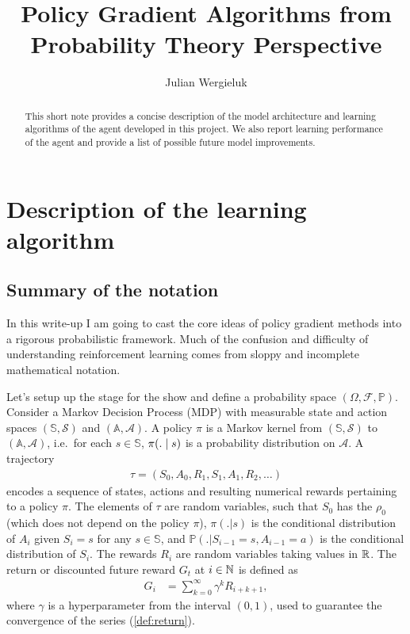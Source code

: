 \documentclass[a4paper,12pt]{amsart}
\title{Policy Gradient Algorithms from Probability Theory Perspective}
\author{Julian Wergieluk}\address{}\email{julian.wergieluk@risklab.com}
\newcommand{\stateSpace}{\mathbb S}
\newcommand{\stateSpaceAlg}{\mathcal S}
\newcommand{\actionSpace}{\mathbb A}
\newcommand{\actionSpaceAlg}{\mathcal A}
\newcommand{\policy}{\pi}
\newcommand{\discountFactor}{\gamma}
\newcommand{\prob}{\mathbb P}
\newcommand{\trajectory}{\tau}
\newcommand{\startStateDist}{\rho_0}
\begin{document}
\maketitle

\begin{abstract}
This short note provides a concise description of the model architecture and
learning algorithms of the agent developed in this project. We also report learning
performance of the agent and provide a list of possible future model improvements.
\end{abstract}

\section{Description of the learning algorithm}


\subsection{Summary of the notation}

In this write-up I am going to cast the core ideas of policy gradient methods
into a rigorous probabilistic framework. Much of the confusion and
difficulty of understanding reinforcement learning comes from sloppy and
incomplete mathematical notation.

Let's setup up the stage for the show and define a probability space
$\left( \Omega, \mathcal F, \prob \right)$.
Consider a Markov Decision Process (MDP) with measurable state and action spaces
$(\stateSpace, \stateSpaceAlg)$ and $(\actionSpace, \actionSpaceAlg)$.
A policy $\policy$ is a Markov kernel from $(\stateSpace, \stateSpaceAlg)$ to
$(\actionSpace, \actionSpaceAlg)$, i.e.\ for each $s\in\stateSpace$, 
$\policy(. \vb s)$ is a probability distribution on $\actionSpaceAlg$.
A trajectory
\begin{align*}
    \trajectory = \left( S_0, A_0, R_1, S_1, A_1, R_2, \ldots \right) 
\end{align*}
encodes a sequence of states, actions and resulting
numerical rewards pertaining to a policy $\policy$. The elements of $\tau$
are random variables, such that $S_{0}$ has the  
$\startStateDist$ (which does not depend on the policy $\pi$), 
$\policy(. | s)$ is the conditional distribution of $A_i$ given $S_i = s$ for
any $s\in\stateSpace$, and $\prob\left(. | S_{i-1}= s, A_{i-1}=a \right)$ is
the conditional distribution of $S_{i}$. The rewards $R_i$ are random
variables taking values in $\mathbb{R}$. The return or discounted future reward $G_t$
at $i\in\mathbb{N}$ is defined as
\begin{align}
    G_i &= \sum_{k=0}^{\infty} \discountFactor^{k} R_{i+k+1},
    \label{def:return}
\end{align}
where $\discountFactor$ is a hyperparameter from the interval $(0,1)$, used to guarantee
the convergence of the series (\ref{def:return}).
\end{document}
